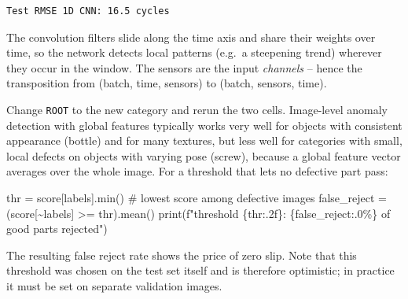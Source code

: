 \documentclass[
  letterpaper,
  DIV=11,
  numbers=noendperiod]{scrreprt}
\newenvironment{Shaded}{\begin{snugshade}}{\end{snugshade}}
\newcommand{\BuiltInTok}[1]{\textcolor[rgb]{0.00,0.23,0.31}{#1}}
\newcommand{\CommentTok}[1]{\textcolor[rgb]{0.37,0.37,0.37}{#1}}
\newcommand{\NormalTok}[1]{\textcolor[rgb]{0.00,0.23,0.31}{#1}}
\newcommand{\OperatorTok}[1]{\textcolor[rgb]{0.37,0.37,0.37}{#1}}
\newcommand{\SpecialCharTok}[1]{\textcolor[rgb]{0.37,0.37,0.37}{#1}}
\newcommand{\SpecialStringTok}[1]{\textcolor[rgb]{0.13,0.47,0.30}{#1}}
\begin{document}
\begin{tcolorbox}
\begin{verbatim}
Test RMSE 1D CNN: 16.5 cycles
\end{verbatim}

The convolution filters slide along the time axis and share their
weights over time, so the network detects local patterns (e.g.~a
steepening trend) wherever they occur in the window. The sensors are the
input \emph{channels} -- hence the transposition from (batch, time,
sensors) to (batch, sensors, time).

\end{tcolorbox}

\begin{tcolorbox}[enhanced jigsaw, left=2mm, title=\textcolor{quarto-callout-caution-color}{\faFire}\hspace{0.5em}{Solution to Exercise 5}, opacityback=0, breakable, rightrule=.15mm, arc=.35mm, toptitle=1mm, colbacktitle=quarto-callout-caution-color!10!white, opacitybacktitle=0.6, coltitle=black, colframe=quarto-callout-caution-color-frame, bottomrule=.15mm, leftrule=.75mm, bottomtitle=1mm, titlerule=0mm, toprule=.15mm, colback=white]

Change \texttt{ROOT} to the new category and rerun the two cells.
Image-level anomaly detection with global features typically works very
well for objects with consistent appearance (bottle) and for many
textures, but less well for categories with small, local defects on
objects with varying pose (screw), because a global feature vector
averages over the whole image. For a threshold that lets no defective
part pass:

\begin{Shaded}
\begin{Highlighting}[]
\NormalTok{thr }\OperatorTok{=}\NormalTok{ score[labels].}\BuiltInTok{min}\NormalTok{()                          }\CommentTok{\# lowest score among defective images}
\NormalTok{false\_reject }\OperatorTok{=}\NormalTok{ (score[}\OperatorTok{\textasciitilde{}}\NormalTok{labels] }\OperatorTok{\textgreater{}=}\NormalTok{ thr).mean()}
\BuiltInTok{print}\NormalTok{(}\SpecialStringTok{f"threshold }\SpecialCharTok{\{}\NormalTok{thr}\SpecialCharTok{:.2f\}}\SpecialStringTok{: }\SpecialCharTok{\{}\NormalTok{false\_reject}\SpecialCharTok{:.0\%\}}\SpecialStringTok{ of good parts rejected"}\NormalTok{)}
\end{Highlighting}
\end{Shaded}

The resulting false reject rate shows the price of zero slip. Note that
this threshold was chosen on the test set itself and is therefore
optimistic; in practice it must be set on separate validation images.

\end{tcolorbox}
\end{document}
